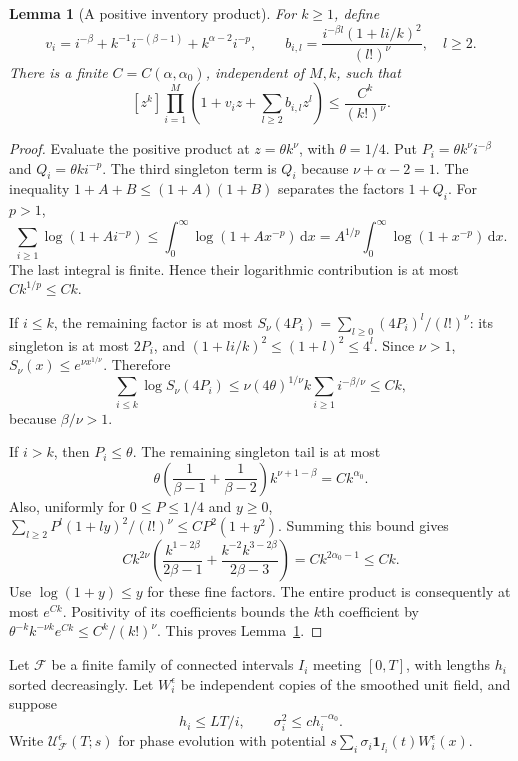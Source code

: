 \documentclass[12pt]{article}
\numberwithin{equation}{section}
\newtheorem{lemma}[theorem]{Lemma}
\theoremstyle{definition}
\newcommand{\ud}{\,\mathrm{d}}
\begin{document}
\begin{lemma}[A positive inventory product]\label{L:inventory-product}
  For $k\ge1$, define
  \[
    v_i=i^{-\beta}+k^{-1}i^{-(\beta-1)}
    +k^{\alpha-2}i^{-p},\qquad
    b_{i,l}=\frac{i^{-\beta l}(1+li/k)^2}{(l!)^\nu},\quad l\ge2.
  \]
  There is a finite $C=C(\alpha,\alpha_0)$, independent of $M,k$, such that
  \begin{equation}\label{E:inventory-product}
    [z^k]\prod_{i=1}^M\left(1+v_i z+\sum_{l\ge2}b_{i,l}z^l\right)
    \le\frac{C^k}{(k!)^\nu}.
  \end{equation}
\end{lemma}

\begin{proof}
  Evaluate the positive product at $z=\theta k^\nu$, with $\theta=1/4$.
  Put $P_i=\theta k^\nu i^{-\beta}$ and
  $Q_i=\theta k i^{-p}$. The third singleton term is $Q_i$ because
  $\nu+\alpha-2=1$. The inequality $1+A+B\le(1+A)(1+B)$
  separates the factors $1+Q_i$.
  For $p>1$,
  \[
    \sum_{i\ge1}\log(1+A i^{-p})
    \le\int_0^\infty\log(1+A x^{-p})\ud x
    =A^{1/p}\int_0^\infty\log(1+x^{-p})\ud x.
  \]
  The last integral is finite. Hence their logarithmic contribution
  is at most $Ck^{1/p}\le Ck$.

  If $i\le k$, the remaining factor is at most
  $S_\nu(4P_i)=\sum_{l\ge0}(4P_i)^l/(l!)^\nu$:
  its singleton is at most $2P_i$, and
  $(1+li/k)^2\le(1+l)^2\le4^l$.
  Since $\nu>1$,
  $S_\nu(x)\le e^{\nu x^{1/\nu}}$.
  Therefore
  \[
    \sum_{i\le k}\log S_\nu(4P_i)
    \le\nu(4\theta)^{1/\nu}k\sum_{i\ge1}i^{-\beta/\nu}
    \le Ck,
  \]
  because $\beta/\nu>1$.

  If $i>k$, then $P_i\le\theta$. The remaining singleton tail is at most
  \[
    \theta\left(\frac1{\beta-1}+\frac1{\beta-2}\right)
    k^{\nu+1-\beta}=Ck^{\alpha_0}.
  \]
  Also, uniformly for $0\le P\le1/4$ and $y\ge0$,
  $\sum_{l\ge2}P^l(1+ly)^2/(l!)^\nu\le CP^2(1+y^2)$.
  Summing this bound gives
  \[
    Ck^{2\nu}\left(\frac{k^{1-2\beta}}{2\beta-1}
    +\frac{k^{-2}k^{3-2\beta}}{2\beta-3}\right)
    =Ck^{2\alpha_0-1}\le Ck.
  \]
  Use $\log(1+y)\le y$ for these fine factors.
  The entire product is consequently at most $e^{Ck}$.
  Positivity of its coefficients bounds the $k$th coefficient by
  $\theta^{-k}k^{-\nu k}e^{Ck}\le C^k/(k!)^\nu$.
  This proves Lemma~\ref{L:inventory-product}.
\end{proof}

Let $\mathcal F$ be a finite family of connected intervals $I_i$
meeting $[0,T]$, with lengths $h_i$ sorted decreasingly.
Let $W_i^\epsilon$ be independent copies of the smoothed unit field,
and suppose
\begin{equation}\label{E:interval-inventory}
  h_i\le L T/i,\qquad \sigma_i^2\le c h_i^{-\alpha_0}.
\end{equation}
Write $\mathcal U_{\mathcal F}^\epsilon(T;s)$ for phase evolution with
potential $s\sum_i\sigma_i\mathbf1_{I_i}(t)W_i^\epsilon(x)$.
\end{document}
